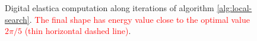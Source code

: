 \documentclass[smallextended]{svjour3}       %
\newcommand{\revision}[1]{\textcolor{red}{#1}}
\begin{document}
\begin{figure}[!h]
\center
{}
\caption{Digital elastica computation along iterations of algorithm \ref{alg:local-search}. \revision{The final shape has energy value close to the optimal value $2\pi/5$ (thin horizontal dashed line)}.}
\label{fig:plot-elastica-local-search}
\end{figure}
\end{document}
